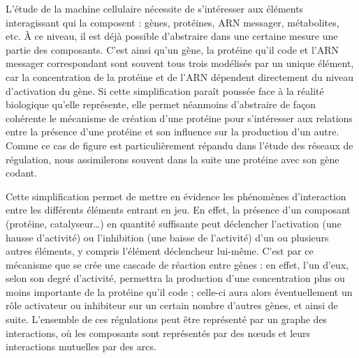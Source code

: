 L'étude de la machine cellulaire nécessite de s'intéresser aux éléments interagissant
qui la composent :
gènes, protéines, ARN messager, métabolites, etc.
% 
À ce niveau, il est déjà possible d'abstraire dans une certaine mesure
une partie des composants.
C'est ainsi qu'un gène, la protéine qu'il code et l'ARN messager correspondant sont
souvent tous trois modélisés par un unique élément,
car la concentration de la protéine et de l'ARN
dépendent directement du niveau d'activation du gène.
Si cette simplification paraît poussée face à la réalité biologique qu'elle représente,
elle permet néanmoins d'abstraire de façon cohérente le mécanisme de création d'une protéine
pour s'intéresser aux relations
entre la présence d'une protéine et son influence sur la production d'un autre.
Comme ce cas de figure est particulièrement répandu dans l'étude des réseaux de régulation,
nous assimilerons souvent dans la suite une protéine avec son gène codant.

Cette simplification permet de mettre en évidence les phénomènes d'interaction entre
les différents éléments entrant en jeu.
En effet, la présence d'un composant (protéine, catalyseur…)
en quantité suffisante peut déclencher
l'activation (une hausse d'activité) ou l'inhibition (une baisse de l'activité)
d'un ou plusieurs autres éléments, y compris l'élément déclencheur lui-même.
C'est par ce mécanisme que se crée une cascade de réaction entre gènes :
en effet, l'un d'eux, selon son degré d'activité,
permettra la production d'une concentration plus ou moins importante de la protéine qu'il code ;
celle-ci aura alors éventuellement un rôle activateur ou inhibiteur sur un certain
nombre d'autres gènes, et ainsi de suite.
L'ensemble de ces régulations peut être représenté par un graphe des interactions,
où les composants sont représentés par des nœuds et leurs interactions mutuelles par des arcs.


